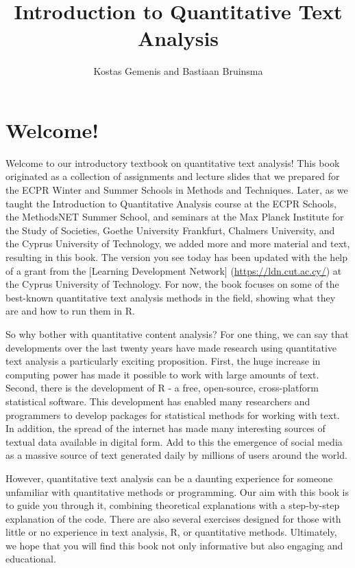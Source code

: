 \documentclass[
]{book}
\title{Introduction to Quantitative Text Analysis}
\author{Kostas Gemenis and Bastiaan Bruinsma}
\date{}
\begin{document}
\maketitle

{
\setcounter{tocdepth}{1}
\tableofcontents
}
\chapter*{Welcome!}\label{welcome}

Welcome to our introductory textbook on quantitative text analysis! This book originated as a collection of assignments and lecture slides that we prepared for the ECPR Winter and Summer Schools in Methods and Techniques. Later, as we taught the Introduction to Quantitative Analysis course at the ECPR Schools, the MethodsNET Summer School, and seminars at the Max Planck Institute for the Study of Societies, Goethe University Frankfurt, Chalmers University, and the Cyprus University of Technology, we added more and more material and text, resulting in this book. The version you see today has been updated with the help of a grant from the {[}Learning Development Network{]} (\url{https://ldn.cut.ac.cy/}) at the Cyprus University of Technology. For now, the book focuses on some of the best-known quantitative text analysis methods in the field, showing what they are and how to run them in R.

So why bother with quantitative content analysis? For one thing, we can say that developments over the last twenty years have made research using quantitative text analysis a particularly exciting proposition. First, the huge increase in computing power has made it possible to work with large amounts of text. Second, there is the development of R - a free, open-source, cross-platform statistical software. This development has enabled many researchers and programmers to develop packages for statistical methods for working with text. In addition, the spread of the internet has made many interesting sources of textual data available in digital form. Add to this the emergence of social media as a massive source of text generated daily by millions of users around the world.

However, quantitative text analysis can be a daunting experience for someone unfamiliar with quantitative methods or programming. Our aim with this book is to guide you through it, combining theoretical explanations with a step-by-step explanation of the code. There are also several exercises designed for those with little or no experience in text analysis, R, or quantitative methods. Ultimately, we hope that you will find this book not only informative but also engaging and educational.
\end{document}
